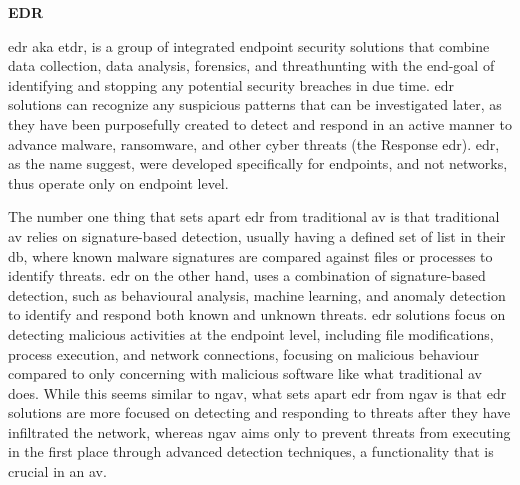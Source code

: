 


\textbf{EDR}

\acrshort{edr} \acrshort{aka} \acrshort{etdr}, is a group of integrated endpoint security solutions that combine data collection,
data analysis, forensics, and \gls{threathunting} with the end-goal of identifying and stopping any potential security breaches in due
time. \acrshort{edr} solutions can recognize any suspicious patterns that can be investigated later, as they have been
purposefully created to detect and respond in an active manner to advance malware, ransomware, and other cyber threats (the Response
\acrshort{edr}). \acrshort{edr}, as the name suggest, were developed specifically for endpoints, and not networks, thus
operate only on endpoint level.

The number one thing that sets apart \acrshort{edr} from traditional \acrshort{av} is that traditional \acrshort{av} relies on
signature-based detection, usually having a defined set of list in their \acrshort{db}, where known malware signatures are compared
against files or processes to identify threats. \acrshort{edr} on the other hand, uses a combination of signature-based detection, such
as behavioural analysis, machine learning, and anomaly detection to identify and respond both known and unknown threats. \acrshort{edr}
solutions focus on detecting malicious activities at the endpoint level, including file modifications, process execution, and network
connections, focusing on malicious behaviour compared to only concerning with malicious software like what traditional \acrshort{av} does.
While this seems similar to \acrshort{ngav}, what sets apart \acrshort{edr} from \acrshort{ngav} is that \acrshort{edr} solutions are
more focused on detecting and responding to threats after they have infiltrated the network, whereas \acrshort{ngav} aims only to
prevent threats from executing in the first place through advanced detection techniques, a functionality that is crucial in an \acrshort{av}.

